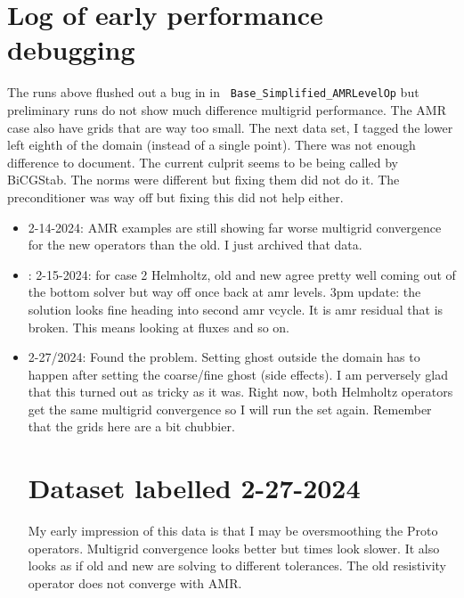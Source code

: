 \documentclass{article}
\begin{document}
\section{Log of early performance debugging}
The  runs above flushed out a bug in in {\tt
  Base\_Simplified\_AMRLevelOp} but preliminary runs do not show much
difference multigrid performance.  The AMR case also have grids that
are way too small.    The next data set, I tagged the lower left eighth
of the domain (instead of a single point).   There was not enough
difference to document.  The current culprit seems to be being called
by BiCGStab.   The norms were different but fixing them did not do it.
The preconditioner was way off but fixing this did not help either.
\begin{itemize}
 \item 2-14-2024:  AMR examples are still showing far worse multigrid convergence
   for the new operators than the old.   I just archived that data.
\item: 2-15-2024: for case 2 Helmholtz, old and new agree pretty well coming
out of the bottom solver but way off once back at amr levels.
3pm update: the solution looks fine heading into second amr vcycle.   It
is amr residual that is broken.   This means looking at fluxes and so on.
\item 2-27/2024: Found the problem.   Setting ghost outside the domain
has to happen after setting the coarse/fine ghost (side effects).    I
am perversely glad that this turned out as tricky as it was.   Right
now, both Helmholtz operators get the same multigrid convergence so I
will run the set again.  Remember that the grids here are a bit chubbier.

\section{Dataset labelled 2-27-2024}
My early impression of this data is that I may be oversmoothing the
Proto operators.    Multigrid convergence looks better but times look
slower.    It also looks as if old and new are solving to different tolerances.
The old resistivity operator does not converge with AMR.


\end{itemize}
\end{document}
